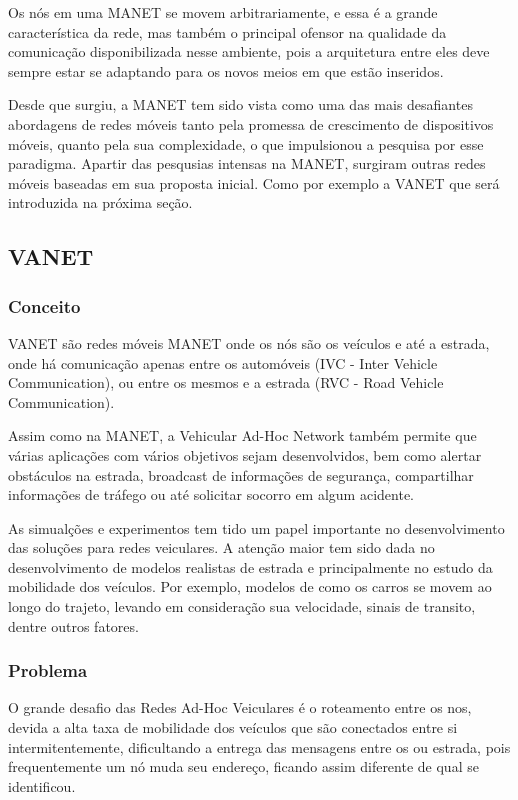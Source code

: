 \documentclass[12pt, %
openright, 
oneside,
a4paper,
brazil]{facom-ufu-abntex2}
\begin{document}
Os nós em uma MANET se movem arbitrariamente, e essa é a grande característica da rede, mas também o principal ofensor na qualidade da comunicação disponibilizada nesse ambiente, pois a arquitetura entre eles deve sempre estar se adaptando para os novos meios em que estão inseridos.
\cite{de2002mobile}

Desde que surgiu, a MANET tem sido vista como uma das mais desafiantes abordagens de redes móveis tanto pela promessa de crescimento de dispositivos móveis, quanto pela sua complexidade, o que impulsionou a pesquisa por esse paradigma. Apartir das pesqusias intensas na MANET, surgiram outras redes móveis baseadas em sua proposta inicial. Como por exemplo a VANET que será introduzida na próxima seção.



\subsection{VANET}
\subsubsection{Conceito}
VANET são redes móveis MANET onde os nós são os veículos e até a estrada, onde há comunicação apenas entre os automóveis (IVC - Inter Vehicle Communication), ou entre os mesmos e a estrada (RVC - Road Vehicle Communication).

Assim como na MANET, a Vehicular Ad-Hoc Network também permite que várias aplicações com vários objetivos sejam desenvolvidos, bem como alertar obstáculos na estrada, broadcast de informações de segurança, compartilhar informações de tráfego ou até solicitar socorro em algum acidente.

As simualções e experimentos tem tido um papel importante no desenvolvimento das soluções para redes veiculares. A atenção maior tem sido dada no desenvolvimento de modelos realistas de estrada e principalmente no estudo da mobilidade dos veículos. Por exemplo, modelos de como os carros se movem ao longo do trajeto, levando em consideração sua velocidade, sinais de transito, dentre outros fatores. 

\subsubsection{Problema}
O grande desafio das Redes Ad-Hoc Veiculares é o roteamento entre os nos, devida a alta taxa de mobilidade dos veículos que são conectados entre si intermitentemente, dificultando a entrega das mensagens entre os  ou estrada, pois frequentemente um nó muda seu endereço, ficando assim diferente de qual se identificou.
\end{document}
